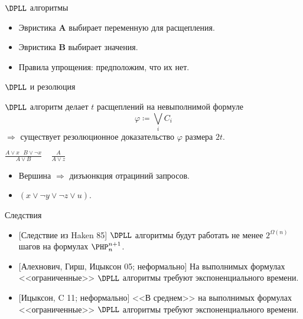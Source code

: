 \begin{frame}{$\DPLL$ алгоритмы}

    \begin{center}
                
    \end{center}

    
	\pause
    \pause
    \pause
    \pause
    \pause
    \begin{itemize}
        \item Эвристика $\mathbf{A}$ выбирает переменную для расщепления.
    	\pause
	    \item Эвристика $\mathbf{B}$ выбирает значения.
    	\pause
    	\item Правила упрощения: \alert{предположим, что их нет}.
    \end{itemize}
\end{frame}

\begin{frame}{$\DPLL$ и резолюция}
    
    \begin{theorem}
        $\DPLL$ алгоритм делает $t$ расщеплений на невыполнимой формуле
        $$\varphi \coloneqq \bigvee\limits_i C_i$$
        $\Rightarrow$ существует резолюционное доказательство $\varphi$ размера $2t$.
    \end{theorem}

    \pause

    \begin{minipage}{0.58\linewidth}
        \centering
        
    \end{minipage}
    \pause
    \begin{minipage}{0.4\linewidth}
        \centering
        $\frac{A \lor x ~~~ B \lor \neg x}{A \lor B} ~~~~~ \frac{A}{A \lor z}$
        \begin{itemize}
            \item Вершина $\Rightarrow$ дизъюнкция отрациний запросов.
            \item $(x \lor \neg y \lor \neg z \lor u)$.
        \end{itemize}
    \end{minipage}

\end{frame}


\begin{frame}{Следствия}

    \begin{itemize}
        \item{} [Следствие из Haken 85] $\DPLL$ алгоритмы будут работать не менее $2^{\Omega(n)}$ шагов
            на формулах $\PHP_{n}^{n + 1}$.
            \pause
        \item{} [Алехнович, Гирш, Ицыксон 05; \alert{неформально}] На выполнимых формулах
            <<ограниченные>> $\DPLL$ алгоритмы требуют экспоненциального времени.
            \pause
        \item{} [Ицыксон, C 11; \alert{неформально}] <<В среднем>> на выполнимых формулах
            <<ограниченные>> $\DPLL$ алгоритмы требуют экспоненциального времени.
    \end{itemize}

\end{frame}
